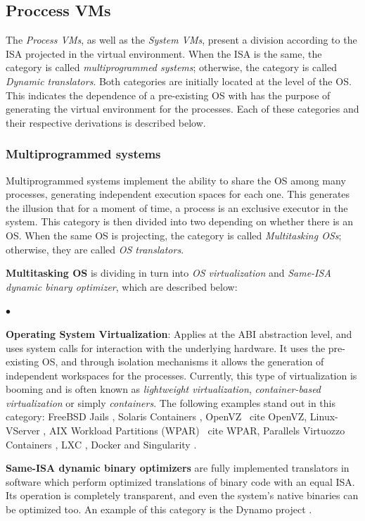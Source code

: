 	\subsection{Proccess VMs}
	
	The \textit{Process VMs}, as well as the \textit{System VMs}, present a division according to the ISA projected in the virtual environment. When the ISA is the same, the category is called \textit{multiprogrammed systems}; otherwise, the category is called \textit{Dynamic translators}. Both categories are initially located at the level of the OS. This indicates the dependence of a pre-existing OS with has the purpose of generating the virtual environment for the processes. Each of these categories and their respective derivations is described below.
	
	\subsubsection{Multiprogrammed systems}
	
	Multiprogrammed systems implement the ability to share the OS among many processes, generating independent execution spaces for each one. This generates the illusion that for a moment of time, a process is an exclusive executor in the system. This category is then divided into two depending on whether there is an OS. When the same OS is projecting, the category is called \textit{Multitasking OSs}; otherwise, they are called \textit{OS translators}.
	
	\textbf {Multitasking OS} is dividing in turn into \textit{OS virtualization} and \textit{Same-ISA dynamic binary optimizer}, which are described below:
		
	\begin{list}{$\bullet$}{\setlength{\leftmargin}{5pt}}
	
		\item \textbf{Operating System Virtualization}: Applies at the ABI abstraction level, and uses system calls for interaction with the underlying hardware. It uses the pre-existing OS, and through isolation mechanisms it allows the generation of independent workspaces for the processes. Currently, this type of virtualization is booming and is often known as \textit {lightweight virtualization}, \textit{container-based virtualization} or simply \textit{containers}. The following examples stand out in this category: FreeBSD Jails \cite {Biederman2006}, Solaris Containers \cite {SolarisZones}, OpenVZ \ cite {OpenVZ}, Linux-VServer \cite {Linux-VServer}, AIX Workload Partitions (WPAR) \ cite {WPAR}, Parallels Virtuozzo Containers \cite {Virtuozzo}, LXC \cite {LXC}, Docker \cite {Docker} and Singularity \cite {Sylabs.io}.
			
		\item \textbf{Same-ISA dynamic binary optimizers} are fully implemented translators in software which perform optimized translations of binary code with an equal ISA. Its operation is completely transparent, and even the system's native binaries can be optimized too. An example of this category is the Dynamo project \cite{Bala2011}.
	\end{list}
		
